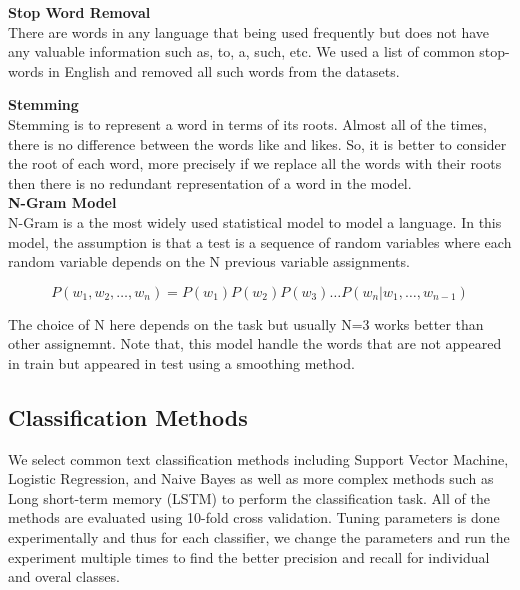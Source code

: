 \documentclass[letterpaper, 12pt]{article}
\begin{document}
\vspace*{10pt}
\textbf{Stop Word Removal}\\


There are words in any language that being used frequently but does not have any valuable information such as, to, a, such, etc. We used a list of common stop-words in English and removed all such words from the datasets.   



\vspace*{10pt}
\textbf{Stemming}\\

Stemming is to represent a word in terms of its roots. Almost all of the times,  there is no difference between the words like and likes. So, it is better to consider the root of each word, more precisely if we replace all the words with their roots then there is no redundant representation of a word in the model. \\

\vspace*{10pt}
\textbf{N-Gram Model}\\

N-Gram is a the most widely used statistical model to model a language. In this model, the assumption is that a test is a sequence of random variables where each random variable depends on the N previous variable assignments. 

\[
	P(w_1, w_2, \ldots, w_n) = P(w_1) P(w_2) P(w_3) \ldots P(w_n|w_1, \ldots, w_{n-1})
\]

The choice of N here depends on the task but usually N=3 works better than other assignemnt. Note that, this model handle the words that are not appeared in train but appeared in test using a smoothing method. \\



\vspace*{10pt}
\subsection{Classification Methods}
We select common text classification methods including Support Vector Machine, Logistic Regression,
and Naive Bayes as well as more complex methods such as Long short-term memory (LSTM) 
to perform the classification task. All of the methods are evaluated using 10-fold cross validation. 
Tuning parameters is done experimentally and thus for each classifier, we change the parameters 
and run the experiment multiple times to find the better precision and recall for individual and 
overal classes. 
\end{document}
